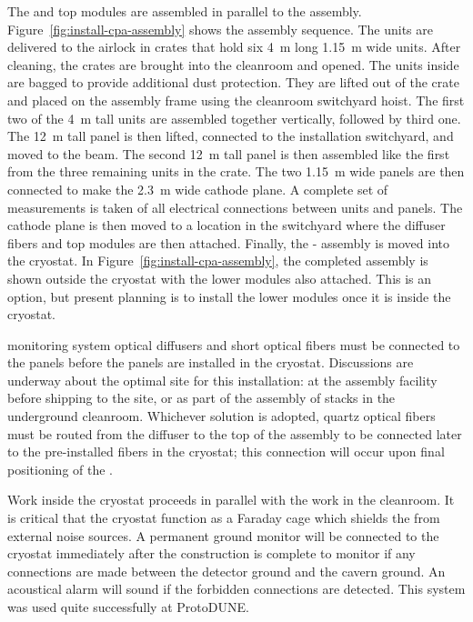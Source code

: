 The  and top  modules are assembled in parallel to the  assembly. Figure~\ref{fig:install-cpa-assembly} shows the  assembly sequence. The  units are delivered to the airlock in crates that hold six \SI{4}{m} long \SI{1.15}{m} wide units. After cleaning, the crates are brought into the cleanroom and opened. The  units inside are bagged to provide additional dust protection. They are lifted out of the crate and placed on the assembly frame using the cleanroom switchyard hoist. 
The first two of the \SI{4}{m} tall units are assembled together vertically, followed by third one.
The \SI{12}{m} tall  panel is then lifted, connected to the installation switchyard, and moved to the  beam. The second \SI{12}{m} tall panel is then assembled like the first from the three remaining  units in the crate. 
The two \SI{1.15}{m} wide panels are then connected to make the \SI{2.3}{m} wide cathode plane.  
A complete set of  measurements is taken of all electrical connections between units and panels.  
The cathode plane  is then moved to a location in the switchyard where the diffuser fibers and top  modules are then attached. 
Finally, the - assembly is moved into the cryostat.
In Figure~\ref{fig:install-cpa-assembly}, the completed assembly is shown outside the cryostat with the lower  modules also attached. 
This is an option, but present planning is to install the lower  modules once it is inside the cryostat. 


 monitoring system optical diffusers and short optical fibers must be connected to the  panels before the panels are installed in the cryostat.  
Discussions are underway about the optimal site for this installation:  at the  assembly facility before shipping to the site, or as part of the assembly of  stacks in the underground cleanroom.  
Whichever solution is adopted, quartz optical fibers must be routed from the diffuser to the top of the  assembly to be connected later to the pre-installed fibers in the cryostat; this connection will occur upon final positioning of the .  

Work inside the cryostat proceeds in parallel with the work in the cleanroom. It is critical that the cryostat function as a Faraday cage which shields the  from external noise sources. A permanent ground monitor will be connected to the cryostat immediately after the construction is complete to monitor if any connections are made between the detector ground and the cavern ground. An acoustical alarm will sound if the forbidden connections are detected. This system was used quite successfully at ProtoDUNE.

